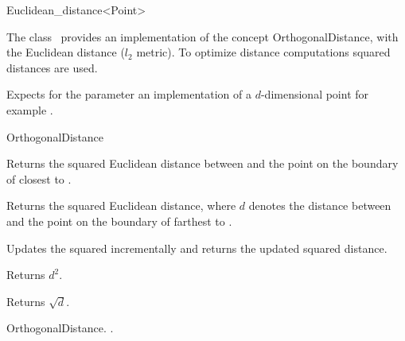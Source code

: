 

\begin{ccRefClass}{Euclidean_distance<Point>}  %


\ccDefinition
  
The class \ccRefName\ provides an implementation of the concept OrthogonalDistance, with the
Euclidean distance ($l_2$ metric).
To optimize distance computations squared distances are used.



\ccParameters

Expects for the parameter
 an implementation
of a $d$-dimensional point
for example .

\ccIsModel

OrthogonalDistance

\ccTypes


\ccCreation
{}  %


\ccOperations
 

{Returns the squared Euclidean distance between  and
the point on the boundary of  closest to .}

{Returns the squared Euclidean distance, where $d$ denotes the distance between  and
the point on the boundary of  farthest to .}

 {Updates the squared  incrementally
and returns the updated squared distance.}

 {Returns $d^2$.}

 {Returns $\sqrt{d}$.}

\ccSeeAlso

OrthogonalDistance.
.
\end{ccRefClass}


